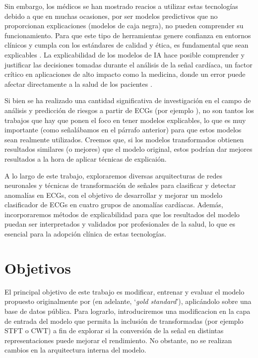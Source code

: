 Sin embargo, los médicos se han mostrado reacios a utilizar estas tecnologías debido a que en muchas ocasiones, por ser modelos predictivos que no proporcionan explicaciones (modelos de caja negra), no pueden comprender su funcionamiento. Para que este tipo de herramientas genere confianza en entornos clínicos y cumpla con los estándares de calidad y ética, es fundamental que sean explicables \citep{Molnar2019}. La explicabilidad de los modelos de IA hace posible comprender y justificar las decisiones tomadas durante el análisis de la señal cardíaca, un factor crítico en aplicaciones de alto impacto como la medicina, donde un error puede afectar directamente a la salud de los pacientes \citep{Goodman2017}.

Si bien se ha realizado una cantidad significativa de investigación en el campo de análisis y predicción de riesgos a partir de ECGs (por ejemplo \cite{Ribeiro}), no son tantos los trabajos que hay que ponen el foco en tener modelos explicables, lo que es muy importante (como señalábamos en el párrafo anterior) para que estos modelos sean realmente utilizados. Creemos que, si los modelos transformados obtienen resultados similares (o mejores) que el modelo original, estos podrían dar mejores resultados a la hora de aplicar técnicas de explicaión.


A lo largo de este trabajo, exploraremos diversas arquitecturas de redes neuronales y técnicas de transformación de señales para clasificar y detectar anomalías en ECGs, con el objetivo de desarrollar y mejorar un modelo clasificador de ECGs en cuatro grupos de anomalías cardíacas. Además, incorporaremos métodos de explicabilidad para que los resultados del modelo puedan ser interpretados y validados por profesionales de la salud, lo que es esencial para la adopción clínica de estas tecnologías.

\section{Objetivos}
El principal objetivo de este trabajo es modificar, entrenar y evaluar el modelo propuesto originalmente por \cite{ribeiro} (en adelante, `\emph{gold standard}'), aplicándolo sobre una base de datos pública. Para lograrlo, introduciremos una modificacion en la capa de entrada del modelo que permita la inclusión de transformadas (por ejemplo STFT o CWT) a fin de explorar si la conversión de la señal en distintas representaciones puede mejorar el rendimiento. No obstante, no se realizan cambios en la arquitectura interna del modelo.

